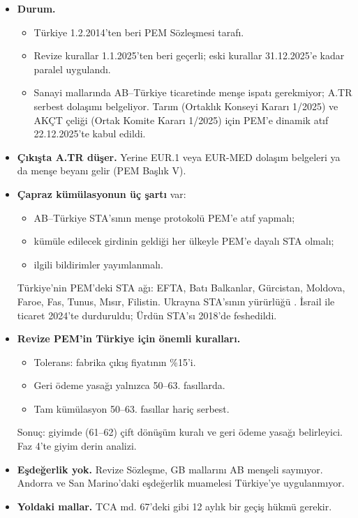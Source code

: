 \begin{itemize}
\item
  \textbf{Durum.}

  \begin{itemize}
  \tightlist
  \item
    Türkiye 1.2.2014'ten beri PEM Sözleşmesi tarafı.
  \item
    Revize kurallar 1.1.2025'ten beri geçerli; eski kurallar 31.12.2025'e kadar paralel uygulandı.
  \item
    Sanayi mallarında AB--Türkiye ticaretinde menşe ispatı gerekmiyor; A.TR serbest dolaşımı belgeliyor. Tarım (Ortaklık Konseyi Kararı 1/2025) ve AKÇT çeliği (Ortak Komite Kararı 1/2025) için PEM'e dinamik atıf 22.12.2025'te kabul edildi.
  \end{itemize}
\item
  \textbf{Çıkışta A.TR düşer.} Yerine EUR.1 veya EUR-MED dolaşım belgeleri ya da menşe beyanı gelir (PEM Başlık V).
\item
  \textbf{Çapraz kümülasyonun üç şartı} var:

  \begin{itemize}
  \tightlist
  \item
    AB--Türkiye STA'sının menşe protokolü PEM'e atıf yapmalı;
  \item
    kümüle edilecek girdinin geldiği her ülkeyle PEM'e dayalı STA olmalı;
  \item
    ilgili bildirimler yayımlanmalı.
  \end{itemize}

  Türkiye'nin PEM'deki STA ağı: EFTA, Batı Balkanlar, Gürcistan, Moldova, Faroe, Fas, Tunus, Mısır, Filistin. Ukrayna STA'sının yürürlüğü \etiketD{}. İsrail ile ticaret 2024'te durduruldu; Ürdün STA'sı 2018'de feshedildi.
\item
  \textbf{Revize PEM'in Türkiye için önemli kuralları.}

  \begin{itemize}
  \tightlist
  \item
    Tolerans: fabrika çıkış fiyatının \%15'i.
  \item
    Geri ödeme yasağı yalnızca 50--63. fasıllarda.
  \item
    Tam kümülasyon 50--63. fasıllar hariç serbest.
  \end{itemize}

  Sonuç: giyimde (61--62) çift dönüşüm kuralı ve geri ödeme yasağı belirleyici. Faz 4'te giyim derin analizi.
\item
  \textbf{Eşdeğerlik yok.} Revize Sözleşme, GB mallarını AB menşeli saymıyor. Andorra ve San Marino'daki eşdeğerlik muamelesi Türkiye'ye uygulanmıyor.
\item
  \textbf{Yoldaki mallar.} TCA md. 67'deki gibi 12 aylık bir geçiş hükmü gerekir.
\end{itemize}

